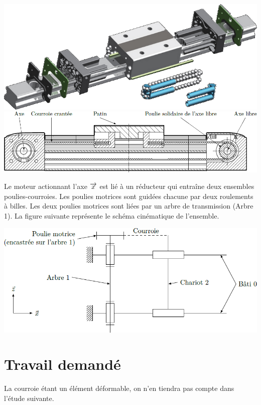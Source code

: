 \documentclass[10pt,fleqn]{article} %
\begin{document}
\begin{multicols}{2}
\begin{center}
\includegraphics[width=.8\linewidth]{images/fig_03}
\includegraphics[width=\linewidth]{images/fig_04}
\end{center}

Le moteur actionnant l’axe $\overrightarrow{x}$ est lié à un réducteur qui entraîne deux ensembles poulies-courroies. Les poulies motrices sont guidées chacune par deux roulements à billes. Les deux poulies motrices sont liées par un arbre de transmission (Arbre 1). La
figure suivante représente le schéma cinématique de l’ensemble.

\begin{center}
\includegraphics[width=\linewidth]{images/fig_05}
\end{center}



\section*{Travail demandé}
La courroie étant un élément déformable, on n’en tiendra pas compte dans l’étude suivante.


\end{multicols}
\end{document}
